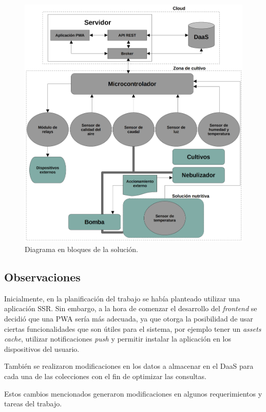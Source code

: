 \begin{figure}[H]
	\centering
	\includegraphics[width=1.00\textwidth]{./Figures/Diagrama en bloques v10.png}
	\caption{Diagrama en bloques de la solución.}
	\label{fig:diagramaEnBloques}
\end{figure}

\subsection{Observaciones}
\label{sec:observaciones}

Inicialmente, en la planificación del trabajo se había planteado utilizar una aplicación SSR. Sin embargo, a la hora de comenzar el desarrollo del \textit{frontend} se decidió que una PWA sería más adecuada, ya que otorga la posibilidad de usar ciertas funcionalidades que son útiles para el sistema,  por ejemplo tener un \emph{assets cache}, utilizar notificaciones \emph{push} y permitir instalar la aplicación en los dispositivos del usuario. 

También se realizaron modificaciones en los datos a almacenar en el DaaS para cada una de las colecciones con el fin de optimizar las consultas.

Estos cambios mencionados generaron modificaciones en algunos requerimientos y tareas del trabajo.

